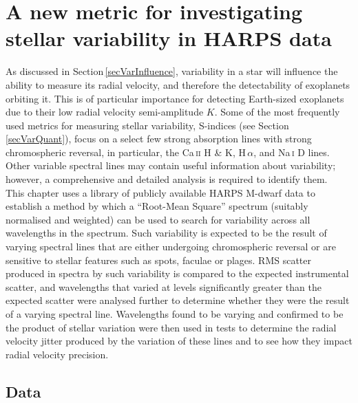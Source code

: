 \chapter{A new metric for investigating stellar variability in HARPS data}
\label{chapISV}
As discussed in Section\,\ref{secVarInfluence}, variability in a star will influence the ability to measure its radial velocity, and therefore the detectability of exoplanets orbiting it. This is of particular importance for detecting Earth-sized exoplanets due to their low radial velocity semi-amplitude $K$. Some of the most frequently used metrics for measuring stellar variability, S-indices (see Section\,\ref{secVarQuant}), focus on a select few strong absorption lines with strong chromospheric reversal, in particular, the Ca\,\textsc{ii} H \& K, H\,\textsc{$\alpha$}, and Na\,\textsc{i} D lines. Other variable spectral lines may contain useful information about variability; however, a comprehensive and detailed analysis is required to identify them.\\

This chapter uses a library of publicly available HARPS M-dwarf data to establish a method by which a ``Root-Mean Square'' spectrum (suitably normalised and weighted) can be used to search for variability across all wavelengths in the spectrum. Such variability is expected to be the result of varying spectral lines that are either undergoing chromospheric reversal or are sensitive to stellar features such as spots, faculae or plages. RMS scatter produced in spectra by such variability is compared to the expected instrumental scatter, and wavelengths that varied at levels significantly greater than the expected scatter were analysed further to determine whether they were the result of a varying spectral line. Wavelengths found to be varying and confirmed to be the product of stellar variation were then used in tests to determine the radial velocity jitter produced by the variation of these lines and to see how they impact radial velocity precision.\\

\section{Data}
